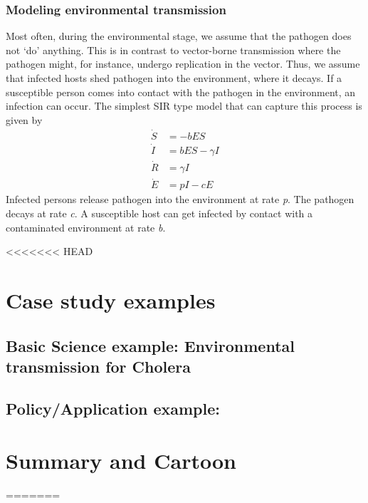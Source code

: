 \documentclass[]{book}
\theoremstyle{definition}
\theoremstyle{definition}
\theoremstyle{definition}
\theoremstyle{remark}
\begin{document}
\hypertarget{myadvancedbox}{%
\subsubsection{Modeling environmental
transmission}\label{myadvancedbox}}

Most often, during the environmental stage, we assume that the pathogen
does not `do' anything. This is in contrast to vector-borne transmission
where the pathogen might, for instance, undergo replication in the
vector. Thus, we assume that infected hosts shed pathogen into the
environment, where it decays. If a susceptible person comes into contact
with the pathogen in the environment, an infection can occur. The
simplest SIR type model that can capture this process is given by \[ 
\begin{aligned}
\dot S &= - b E S \\
\dot I &= b E S  - \gamma I \\
\dot R &= \gamma I \\
\dot E &= p I - cE
\end{aligned}
\] Infected persons release pathogen into the environment at rate
\emph{p}. The pathogen decays at rate \emph{c}. A susceptible host can
get infected by contact with a contaminated environment at rate
\emph{b}.

<<<<<<< HEAD
\hypertarget{case-study-examples-1}{%
\section{Case study examples}\label{case-study-examples-1}}

\hypertarget{basic-science-example-environmental-transmission-for-cholera}{%
\subsection{Basic Science example: Environmental transmission for
Cholera}\label{basic-science-example-environmental-transmission-for-cholera}}

\hypertarget{policyapplication-example}{%
\subsection{Policy/Application
example:}\label{policyapplication-example}}

\hypertarget{summary-and-cartoon-2}{%
\section{Summary and Cartoon}\label{summary-and-cartoon-2}}
=======
\end{document}
